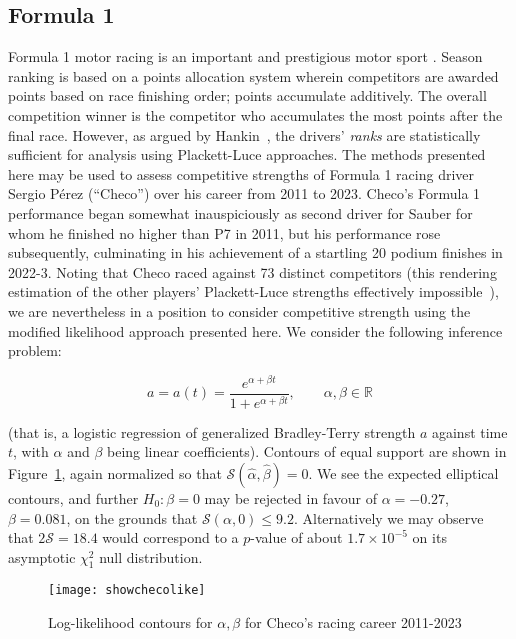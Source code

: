 \documentclass[sts]{imsart}
\begin{document}
\subsection{Formula 1}

Formula 1 motor racing is an important and prestigious motor sport
\citep{codling2017,jenkins2010}.  Season ranking is based on a points
allocation system wherein competitors are awarded points based on race
finishing order; points accumulate additively.  The overall
competition winner is the competitor who accumulates the most points
after the final race.  However, as argued by
Hankin~\cite{hankin2023_formula1points}, the drivers' {\em ranks} are
statistically sufficient for analysis using Plackett-Luce approaches.
The methods presented here may be used to assess competitive strengths
of Formula 1 racing driver Sergio P\'{e}rez (``Checo'') over his
career from 2011 to 2023.  Checo's Formula 1 performance began
somewhat inauspiciously as second driver for Sauber for whom he
finished no higher than P7 in 2011, but his performance rose
subsequently, culminating in his achievement of a startling 20 podium
finishes in 2022-3.  Noting that Checo raced against 73 distinct
competitors (this rendering estimation of the other players'
Plackett-Luce strengths effectively impossible~\cite{hankin2020}), we
are nevertheless in a position to consider competitive strength using
the modified likelihood approach presented here.  We consider the
following inference problem:

\begin{equation}
  a = a(t) = \frac{e^{\alpha + \beta t}}{1+e^{\alpha + \beta t}},\qquad\alpha,\beta\in\mathbb{R}
\end{equation}

(that is, a logistic regression of generalized Bradley-Terry strength
$a$ against time $t$, with $\alpha$ and $\beta$ being linear
coefficients).  Contours of equal support are shown in
Figure~\ref{showchecolike}, again normalized so that
$\mathcal{S}(\hat{\alpha},\hat{\beta})=0$.  We see the expected
elliptical contours, and further $H_0\colon\beta=0$ may be rejected in
favour of $\alpha=-0.27$, $\beta=0.081$, on the grounds that
$\mathcal{S}(\alpha,0)\leqslant 9.2$.  Alternatively we may observe
that $2\mathcal{S}=18.4$ would correspond to a $p$-value of about
$1.7\times 10^{-5}$ on its asymptotic $\chi^2_1$ null distribution.

\begin{figure}[t]
\texttt{[image: showchecolike]}  %
\caption{Log-likelihood contours for $\alpha,\beta$ for Checo's racing
  career 2011-2023\label{showchecolike}}
\end{figure}
\end{document}
